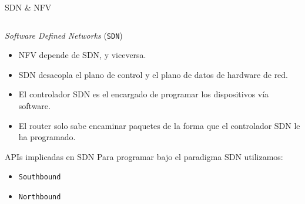 \documentclass[aspectratio=169,xcolor=dvipsnames]{beamer}
\begin{document}
	\begin{frame}{SDN \& NFV}
        \begin{columns}
            \begin{column}{0.6\textwidth}
            \begin{alertblock}{\textit{Software Defined Networks} (\texttt{SDN})}
            \begin{itemize}
                \item NFV depende de SDN, y viceversa.
                \item SDN desacopla el plano de control y el plano de datos de hardware de red. 
                \item El controlador SDN es el encargado de programar los dispositivos vía software.
                \item El router solo sabe encaminar paquetes de la forma que el controlador SDN le ha programado.
            \end{itemize}
            \end{alertblock}
            
            \begin{block}{APIs implicadas en SDN}
                    Para programar bajo el paradigma SDN utilizamos:
                    \begin{itemize}
                        \item \texttt{Southbound}
                        \item \texttt{Northbound} 
                    \end{itemize}
            \end{block}
            \end{column}
            

\end{columns}
\end{frame}
\end{document}
